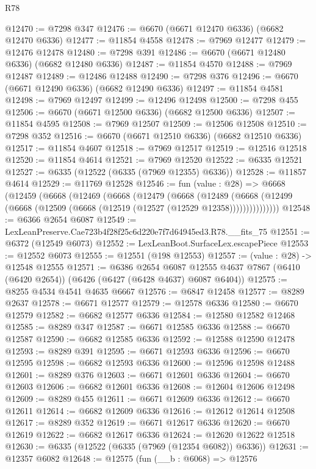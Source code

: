 \begin{lexlean}{R78}
\begin{coremodule}
@12470 := @7298 @347
@12476 := @6670 (@6671 @12470 @6336) (@6682 @12470 @6336)
@12477 := @11854 @4558
@12478 := @7969 @12477
@12479 := @12476 @12478
@12480 := @7298 @391
@12486 := @6670 (@6671 @12480 @6336) (@6682 @12480 @6336)
@12487 := @11854 @4570
@12488 := @7969 @12487
@12489 := @12486 @12488
@12490 := @7298 @376
@12496 := @6670 (@6671 @12490 @6336) (@6682 @12490 @6336)
@12497 := @11854 @4581
@12498 := @7969 @12497
@12499 := @12496 @12498
@12500 := @7298 @455
@12506 := @6670 (@6671 @12500 @6336) (@6682 @12500 @6336)
@12507 := @11854 @4595
@12508 := @7969 @12507
@12509 := @12506 @12508
@12510 := @7298 @352
@12516 := @6670 (@6671 @12510 @6336) (@6682 @12510 @6336)
@12517 := @11854 @4607
@12518 := @7969 @12517
@12519 := @12516 @12518
@12520 := @11854 @4614
@12521 := @7969 @12520
@12522 := @6335 @12521
@12527 := @6335 (@12522 (@6335 (@7969 @12355) @6336))
@12528 := @11857 @4614
@12529 := @11769 @12528
@12546 := fun (value : @28) =>
  @6668
    (@12459
      (@6668
        (@12469
          (@6668
            (@12479
              (@6668
                (@12489
                  (@6668 (@12499 (@6668 (@12509 (@6668 (@12519 (@12527 (@12529 @12358)))))))))))))))
@12548 := @6366 @2654 @6087
@12549 := LexLeanPreserve.Cae723b4f28f25c6d220e7f7d64945ed3.R78.__fits_75
@12551 := @6372 (@12549 @6073)
@12552 := LexLeanBoot.SurfaceLex.escapePiece
@12553 := @12552 @6073
@12555 := @12551 (@198 @12553)
@12557 := (value : @28) -> @12548 @12555
@12571 := @6386
    @2654
    @6087
    @12555
    @4637
    @7867
    (@6410 (@6420 @2654))
    (@6426 (@6427 (@6428 @4637) @6087 @6404))
@12575 := @8255 @4534 @4541 @4635 @6667
@12576 := @6847 @12458
@12577 := @8289 @2637
@12578 := @6671 @12577
@12579 := @12578 @6336
@12580 := @6670 @12579
@12582 := @6682 @12577 @6336
@12584 := @12580 @12582 @12468
@12585 := @8289 @347
@12587 := @6671 @12585 @6336
@12588 := @6670 @12587
@12590 := @6682 @12585 @6336
@12592 := @12588 @12590 @12478
@12593 := @8289 @391
@12595 := @6671 @12593 @6336
@12596 := @6670 @12595
@12598 := @6682 @12593 @6336
@12600 := @12596 @12598 @12488
@12601 := @8289 @376
@12603 := @6671 @12601 @6336
@12604 := @6670 @12603
@12606 := @6682 @12601 @6336
@12608 := @12604 @12606 @12498
@12609 := @8289 @455
@12611 := @6671 @12609 @6336
@12612 := @6670 @12611
@12614 := @6682 @12609 @6336
@12616 := @12612 @12614 @12508
@12617 := @8289 @352
@12619 := @6671 @12617 @6336
@12620 := @6670 @12619
@12622 := @6682 @12617 @6336
@12624 := @12620 @12622 @12518
@12630 := @6335 (@12522 (@6335 (@7969 (@12354 @6082)) @6336))
@12631 := @12357 @6082
@12648 := @12575
    (fun (__b : @6068) =>
    @12576

\end{coremodule}
\end{lexlean}
